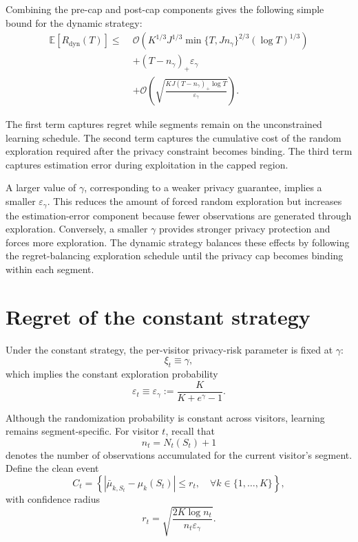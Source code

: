 \documentclass[mksc,nonblindrev]{informs3}
\begin{document}
\begin{APPENDICES}
Combining the pre-cap and post-cap components gives the following simple bound for the dynamic strategy:
\begin{equation}
\label{eq:dynamic-total-regret}
\boxed{
\begin{aligned}
\mathbb E[R_{\mathrm{dyn}}(T)]
\leq\;&
\mathcal O\left(
K^{1/3}
J^{1/3}
\min\{T,Jn_\gamma\}^{2/3}
(\log T)^{1/3}
\right)
\\
&+
(T-n_\gamma)_+\varepsilon_\gamma
\\
&+
\mathcal O\left(
\sqrt{
\frac{
KJ(T-n_\gamma)_+\log T
}{
\varepsilon_\gamma
}
}
\right).
\end{aligned}
}
\end{equation}

The first term captures regret while segments remain on the unconstrained learning schedule. The second term captures the cumulative cost of the random exploration required after the privacy constraint becomes binding. The third term captures estimation error during exploitation in the capped region.

A larger value of \(\gamma\), corresponding to a weaker privacy guarantee, implies a smaller \(\varepsilon_\gamma\). This reduces the amount of forced random exploration but increases the estimation-error component because fewer observations are generated through exploration. Conversely, a smaller \(\gamma\) provides stronger privacy protection and forces more exploration. The dynamic strategy balances these effects by following the regret-balancing exploration schedule until the privacy cap becomes binding within each segment.


\section{Regret of the constant strategy}
\label{app:constant}

Under the constant strategy, the per-visitor privacy-risk parameter is fixed at
\(\gamma\):
\begin{equation}
\xi_t
\equiv
\gamma,
\end{equation}
which implies the constant exploration probability
\begin{equation}
\label{eq:constant-epsilon}
\varepsilon_t
\equiv
\varepsilon_\gamma
:=
\frac{K}{K+e^\gamma-1}.
\end{equation}

Although the randomization probability is constant across visitors, learning remains segment-specific. For visitor \(t\), recall that
\[
n_t=N_t(S_t)+1
\]
denotes the number of observations accumulated for the current visitor's segment. Define the clean event
\begin{equation}
C_t
=
\left\{
\left|
\bar{\mu}_{k,S_t}
-
\mu_k(S_t)
\right|
\leq r_t,
\quad
\forall k\in\{1,\ldots,K\}
\right\},
\end{equation}
with confidence radius
\begin{equation}
r_t
=
\sqrt{
\frac{2K\log n_t}
{n_t\varepsilon_\gamma}
}.
\end{equation}


\end{APPENDICES}
\end{document}
